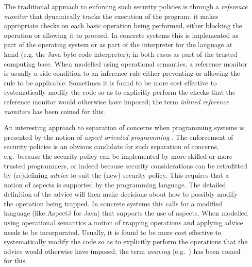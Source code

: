 \documentclass[a4paper]{llncs}
\begin{document}
The traditional approach to enforcing such security policies is
through a \emph{reference monitor} \cite{Gollmann} that dynamically
tracks the execution of the program; it makes appropriate checks on
each basic operation being performed, either blocking the operation or
allowing it to proceed. In concrete systems this is implemented as
part of the operating system or as part of the interpreter for the
language at hand (e.g. the Java byte code interpreter); in both cases
as part of the trusted computing base. When modelled using operational
semantics, a reference monitor is usually a side condition to an
inference rule either preventing or allowing the rule to be
applicable. Sometimes it is found to be more cost effective to
systematically modify the code so as to explicitly perform the checks
that the reference monitor would otherwise have imposed; the term
\emph{inlined reference monitors} \cite{UlfarSchneider} has been
coined for this.

An interesting approach to separation of concerns when programming
systems is presented by the notion of \emph{aspect oriented
programming} \cite{kiczales2001oa,kiczales97aspectoriented}.  The
enforcement of security policies is an obvious candidate for such
separation of concerns, e.g.~because the security policy can be
implemented by more skilled or more trusted programmers, or indeed
because security considerations can be retrofitted by (re)defining
\emph{advice} to suit the (new) security policy. This requires that a
notion of aspects is supported by the programming language.  The
detailed definition of the advice will then make decisions about how
to possibly modify the operation being trapped. In concrete systems
this calls for a modified language (like AspectJ \cite{pldi05abc} for
Java) that supports the use of aspects. When modelled using
operational semantics a notion of trapping operations and applying
advice needs to be incorporated.  Usually, it is found to be more
cost effective to systematically modify the code so as to explicitly
perform the operations that the advice would otherwise have imposed;
the term \emph{weaving} (e.g.~\cite{pldi05abc}) has been coined for
this.
\end{document}
